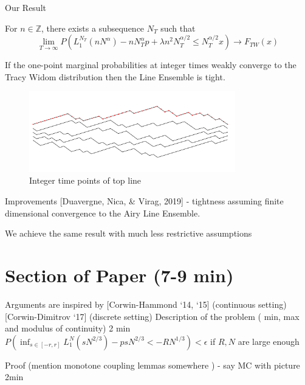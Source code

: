 \documentclass[9pt,t]{beamer}
\begin{document}
\begin{frame}{Our Result}
\begin{theorem}For $n\in \mathbb{Z}$, there exists a subsequence $N_T$ such that
\[\lim_{T\to\infty}P(L_1^{N_T}(nN^{\alpha}) - nN_T^{\alpha} p + \lambda n^2 N_T^{\alpha/2} \leq N_T^{\alpha/2} x) \to F_{TW}(x)\]
\end{theorem}
If the one-point marginal probabilities at integer times weakly converge to the Tracy Widom distribution then the Line Ensemble is tight.
\begin{figure}
	\includegraphics[width=0.8\textwidth]{graphics/ConvToTW.jpg}
	\caption{Integer time points of top line}
\end{figure}
\end{frame}

\begin{frame}{Improvements}
[Duavergne, Nica, \& Virag, 2019] - tightness assuming finite dimensional convergence to the Airy Line Ensemble. 

We achieve the same result with much less restrictive assumptions
\newline\newline{}
\end{frame}


\section{Section of Paper (7-9 min)}

\begin{frame}
Arguments are inspired by [Corwin-Hammond ‘14, ‘15] (continuous setting) [Corwin-Dimitrov ‘17] (discrete setting) Description of the problem ( min, max and modulus of continuity)
2 min   $P( \inf_{s\in[-r, r]} L_1^N(sN^{2/3}) - psN^{2/3}  < -RN^{1/3} ) < \epsilon$ if $R,N$ are large enough  
\end{frame}

\begin{frame}
Proof  (mention monotone coupling lemmas somewhere ) - say MC with picture
2min
\end{frame}
\end{document}

